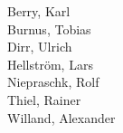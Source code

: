 \documentclass{fontdokuold}
\begin{document}
\begin{multicols}{2}
Berry, Karl\\
Burnus, Tobias\\
Dirr, Ulrich\\
Hellström, Lars\\
Niepraschk, Rolf\\
Thiel, Rainer\\
Willand, Alexander\\
\end{multicols}












%
%
%
%
%
%
%
%
\end{document}
